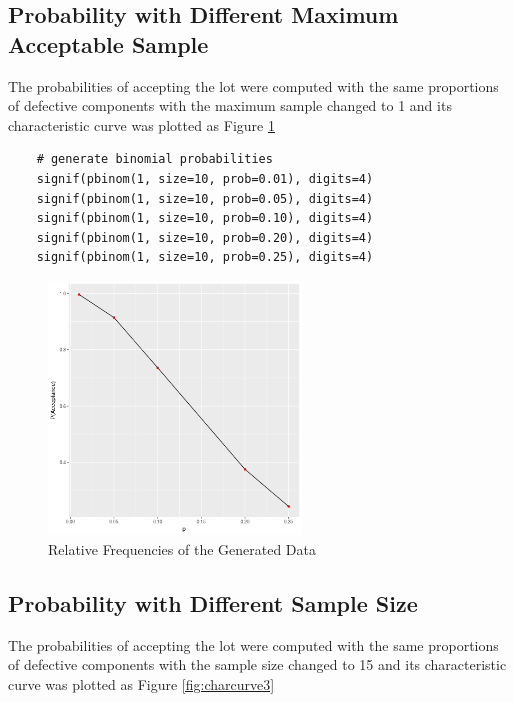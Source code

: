 \documentclass{article}
\begin{document}
        \subsection{Probability with Different Maximum Acceptable Sample}
            The probabilities of accepting the lot were computed with the same proportions of defective components with the maximum sample changed to 1 and its characteristic curve was plotted as Figure \ref{fig:charcurve2}

\begin{lstlisting}
    # generate binomial probabilities
    signif(pbinom(1, size=10, prob=0.01), digits=4)
    signif(pbinom(1, size=10, prob=0.05), digits=4)
    signif(pbinom(1, size=10, prob=0.10), digits=4)
    signif(pbinom(1, size=10, prob=0.20), digits=4)
    signif(pbinom(1, size=10, prob=0.25), digits=4)
\end{lstlisting}

            \begin{figure}[h]
                \begin{center}
                    \includegraphics[width=0.6\textwidth]{charcurve2.png}
                    \caption{Relative Frequencies of the Generated Data} \label{fig:charcurve2}
                \end{center}
            \end{figure}

        \subsection{Probability with Different Sample Size}
            The probabilities of accepting the lot were computed with the same proportions of defective components with the sample size changed to 15 and its characteristic curve was plotted as Figure \ref{fig:charcurve3}
\end{document}
